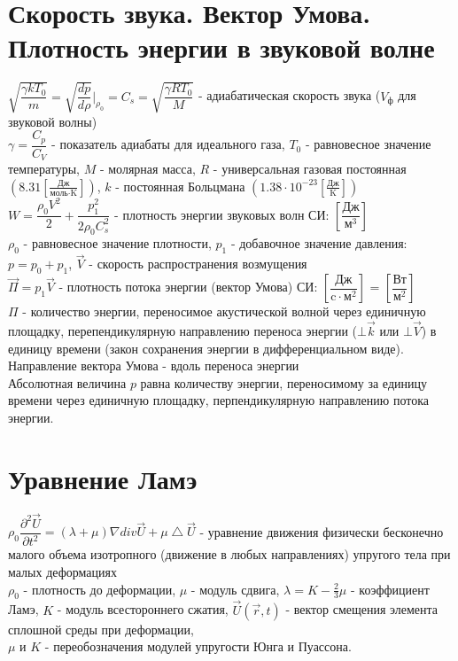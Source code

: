\begin{multicols*}{2}
		\section{Скорость звука. Вектор Умова. Плотность энергии в звуковой волне}
		$\sqrt{\dfrac{\gamma k T_0}{m}} = \sqrt{\dfrac{dp}{d\rho}}\bigg|_{\rho_0} = C_s = \sqrt{\dfrac{\gamma R T_0}{M}}$ - адиабатическая скорость звука ($V_\text{ф}$ для звуковой волны)\\
		$\gamma = \dfrac{C_p}{C_V}$ - показатель адиабаты для идеального газа, $T_0$ - равновесное значение температуры, $M$ - молярная масса, $R$ - универсальная газовая постоянная $\left(8.31 \left[\frac{\text{Дж}}{\text{моль}\cdot\text{K}}\right]\right)$, $k$ - постоянная Больцмана $\left(1.38\cdot10^{-23} \left[\frac{\text{Дж}}{\text{K}}\right]\right)$\\
		$W = \dfrac{\rho_0 V^2}{2} + \dfrac{p_1^2}{2\rho_0 {C}_{s}^2}$ - плотность энергии звуковых волн \quad СИ: $\left[\dfrac{\text{Дж}}{\text{м}^3}\right]$\\
		$\rho_0$ - равновесное значение плотности, $p_1$ - добавочное значение давления: $p = p_0 + p_1$, $\vec{V}$ - скорость распространения возмущения\\
		$\vec\Pi = p_1 \vec{V}$ - плотность потока энергии (вектор Умова) \quad СИ: $\left[\dfrac{\text{Дж}}{\text{c}\cdot \text{м}^2}\right]$ = $\left[\dfrac{\text{Вт}}{\text{м}^2}\right]$\\
		$\Pi$ - количество энергии, переносимое акустической волной через единичную площадку, перепендикулярную направлению переноса энергии ($\bot \vec{k}$ или $\bot \vec{V}$) в единицу времени (закон сохранения энергии в дифференциальном виде). Направление вектора Умова - вдоль переноса энергии\\
		Абсолютная величина $p$ равна количеству энергии, переносимому за единицу времени через единичную площадку, перпендикулярную направлению потока энергии.

		\section{Уравнение Ламэ}
		$\rho_0 \dfrac{\partial^2 \vec{U}}{\partial t^2} = (\lambda + \mu) \nabla div \vec{U} + \mu \bigtriangleup  \vec{U}$ - уравнение движения физически бесконечно малого объема изотропного (движение в любых направлениях) упругого тела при малых деформациях\\
		$\rho_0$ - плотность до деформации, $\mu$ - модуль сдвига, $\lambda = K - \frac{2}{3}\mu$ - коэффициент Ламэ, $K$ - модуль всестороннего сжатия, $\vec{U}(\vec{r}, t)$ - вектор смещения элемента сплошной среды при деформации,\\
		$\mu$ и $K$ - переобозначения модулей упругости Юнга и Пуассона.


\end{multicols*}
